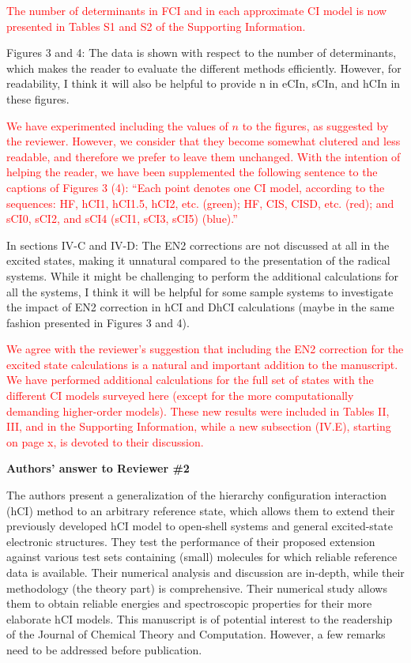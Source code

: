 \documentclass[10pt]{letter}
\newcommand{\alert}[1]{\textcolor{red}{#1}}
\begin{document}
\begin{letter}
\alert{
The number of determinants in FCI and in each approximate CI model is now presented in Tables S1 and S2 of the Supporting Information.
}

{Figures 3 and 4: The data is shown with respect to the number of determinants, which makes the
reader to evaluate the different methods efficiently. However, for readability, I think it will also be
helpful to provide n in eCIn, sCIn, and hCIn in these figures.
}

\alert{
We have experimented including the values of $n$ to the figures, as suggested by the reviewer.
However, we consider that they become somewhat clutered and less readable, and therefore we prefer to leave them unchanged.
With the intention of helping the reader, we have been supplemented the following sentence to the captions of Figures 3 (4):
``Each point denotes one CI model, according to the sequences: HF, hCI1, hCI1.5, hCI2, etc. (green); HF, CIS, CISD, etc. (red); and sCI0, sCI2, and sCI4 (sCI1, sCI3, sCI5) (blue).''
}

{In sections IV-C and IV-D: The EN2 corrections are not discussed at all in the excited states, making
it unnatural compared to the presentation of the radical systems. While it might be challenging to
perform the additional calculations for all the systems, I think it will be helpful for some sample
systems to investigate the impact of EN2 correction in hCI and DhCI calculations (maybe in the
same fashion presented in Figures 3 and 4).
}

\alert{
We agree with the reviewer's suggestion that including the EN2 correction for the excited state calculations is a natural and important addition to the manuscript.
We have performed additional calculations for the full set of states with the different CI models surveyed here (except for the more computationally demanding higher-order models).
These new results were included in Tables II, III, and in the Supporting Information, while a new subsection (IV.E), starting on page x, is devoted to their discussion.
}


\clearpage


\noindent \textbf{\large Authors' answer to Reviewer \#2}

{The authors present a generalization of the hierarchy configuration interaction (hCI) method to an arbitrary reference state, which allows them to extend their previously developed hCI model to open-shell systems and general excited-state electronic structures. They test the performance of their proposed extension against various test sets containing (small) molecules for which reliable reference data is available. Their numerical analysis and discussion are in-depth, while their methodology (the theory part) is comprehensive. Their numerical study allows them to obtain reliable energies and spectroscopic properties for their more elaborate hCI models. This manuscript is of potential interest to the readership of the Journal of Chemical Theory and Computation. However, a few remarks need to be addressed before publication.
}


\end{letter}
\end{document}

